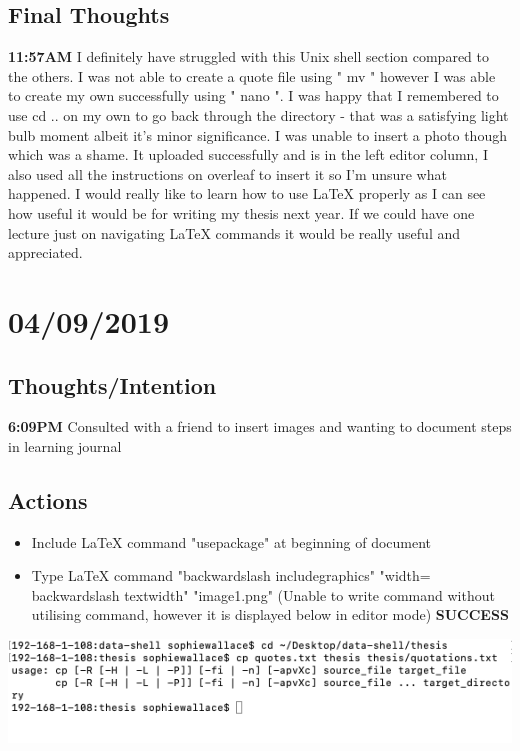 \documentclass{article}
\begin{document}
\subsection{Final Thoughts}
\textbf{11:57AM} I definitely have struggled with this Unix shell section compared to the others. I was not able to create a quote file using " mv " however I was able to create my own successfully using " nano ". I was happy that I remembered to use cd .. on my own to go back through the directory - that was a satisfying light bulb moment albeit it's minor significance. I was unable to insert a photo though which was a shame. It uploaded successfully and is in the left editor column, I also used all the instructions on overleaf to insert it so I'm unsure what happened. I would really like to learn how to use LaTeX properly as I can see how useful it would be for writing my thesis next year. If we could have one lecture just on navigating LaTeX commands it would be really useful and appreciated. 


\section{04/09/2019}
\subsection{Thoughts/Intention}
\textbf{6:09PM} Consulted with a friend to insert images and wanting to document steps in learning journal

\subsection{Actions}
\begin{itemize}
\item Include LaTeX command "usepackage" at beginning of document 
\item Type LaTeX command "backwardslash includegraphics" "width= backwardslash textwidth" "image1.png" (Unable to write command without utilising command, however it  is displayed below in editor mode) \textbf{SUCCESS}
\end{itemize}


\includegraphics[width=\textwidth]{Images/image1.png}
\end{document}
